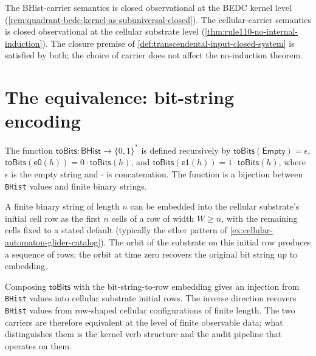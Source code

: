 \begin{principle}
\label{prin:cellular-carrier-both-closed-observational}
The BHist-carrier semantics is closed observational at the BEDC kernel level (\autoref{rem:quadrant-bedc-kernel-as-subuniversal-closed}). The cellular-carrier semantics is closed observational at the cellular substrate level (\autoref{thm:rule110-no-internal-induction}). The closure premise of \autoref{def:transcendental-input-closed-system} is satisfied by both; the choice of carrier does not affect the no-induction theorem.
\end{principle}

\section{The equivalence: bit-string encoding}
\label{sec:cellular-carrier-equivalence}

\begin{definition}
\label{def:cellular-carrier-bhist-to-bitstring}
The function $\mathsf{toBits} \colon \mathsf{BHist} \to \{0,1\}^*$ is defined recursively by $\mathsf{toBits}(\mathsf{Empty}) = \epsilon$, $\mathsf{toBits}(\mathsf{e0}(h)) = 0 \cdot \mathsf{toBits}(h)$, and $\mathsf{toBits}(\mathsf{e1}(h)) = 1 \cdot \mathsf{toBits}(h)$, where $\epsilon$ is the empty string and $\cdot$ is concatenation. The function is a bijection between \texttt{BHist} values and finite binary strings.
\end{definition}

\begin{definition}
\label{def:cellular-carrier-bitstring-as-row}
A finite binary string of length $n$ can be embedded into the cellular substrate's initial cell row as the first $n$ cells of a row of width $W \geq n$, with the remaining cells fixed to a stated default (typically the ether pattern of \autoref{ex:cellular-automaton-glider-catalog}). The orbit of the substrate on this initial row produces a sequence of rows; the orbit at time zero recovers the original bit string up to embedding.
\end{definition}

\begin{principle}
\label{prin:cellular-carrier-equivalence-under-encoding}
Composing $\mathsf{toBits}$ with the bit-string-to-row embedding gives an injection from \texttt{BHist} values into cellular substrate initial rows. The inverse direction recovers \texttt{BHist} values from row-shaped cellular configurations of finite length. The two carriers are therefore equivalent at the level of finite observable data; what distinguishes them is the kernel verb structure and the audit pipeline that operates on them.
\end{principle}

